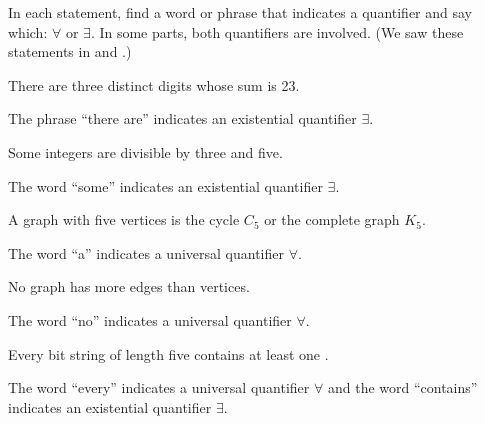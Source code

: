 \begin{exam}
\label{exam_words_quants}
    In each statement, find a word or phrase that indicates a quantifier and say which: $\forall$ or $\exists$.  In some parts, both quantifiers are involved.  (We saw these statements in  and .)
        \begin{apart}
            \item  There are three distinct digits whose sum is 23.
                \begin{soln}
                    The phrase ``there are'' indicates an existential quantifier $\exists$.
                \end{soln}

            \item Some integers are divisible by three and five.
                \begin{soln}
                    The word ``some'' indicates an existential quantifier $\exists$.
                \end{soln}
                
            \item A graph with five vertices is the cycle $C_5$ or the complete graph $K_5$. 
                \begin{soln}
                    The word ``a'' indicates a universal quantifier $\forall$.
                \end{soln}
                
            \item  
            No graph has more edges than vertices. 
                \begin{soln}
                    The word ``no'' indicates a universal quantifier $\forall$.
                \end{soln}
                
            \item \label{part_bs5_contains1} Every bit string of length five contains at least one .
                \begin{soln}
                    The word ``every'' indicates a universal quantifier $\forall$ and the word ``contains'' indicates an existential quantifier $\exists$.
                \end{soln}
        \end{apart}
\end{exam}

\newcommand{\subpffquants}{Proof Formats: $\forall$ and $\exists$}
